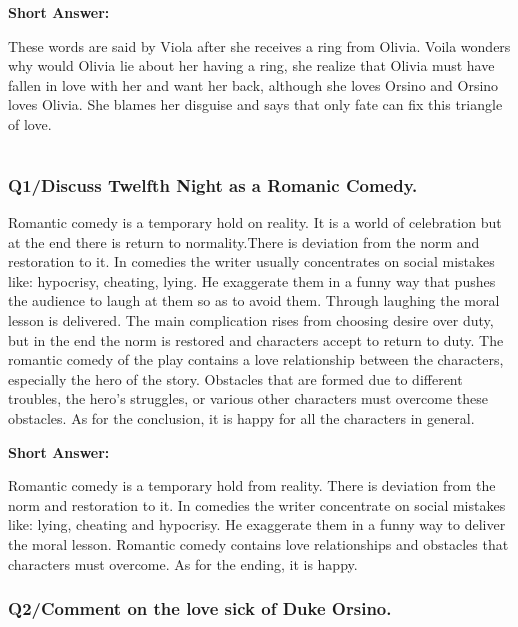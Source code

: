 \documentclass[12pt, a4paper]{article}
\begin{document}
\textbf{Short Answer:}\smallbreak

These words are said by Viola after she receives a ring from Olivia. Voila
wonders why would Olivia lie about her having a ring, she realize that 
Olivia must have fallen in love with her and want her back, although
she loves Orsino and Orsino loves Olivia. She blames  her disguise and 
says that only fate can fix this triangle of love.

\section*{}\bigbreak

\subsubsection*{Q1/Discuss Twelfth Night as a Romanic Comedy.}

Romantic comedy is a temporary hold on reality. It is a world of 
celebration but at the end there is return to normality.There is 
deviation from
the norm and restoration to it. In comedies the writer usually 
concentrates on social mistakes like: hypocrisy, cheating, lying. He
exaggerate them in a funny way that pushes the audience to laugh at them so as to avoid them. 
Through laughing the moral lesson is delivered. The main complication
rises from choosing desire over duty, but in the end the norm is
restored and characters accept to return to duty. The romantic comedy
of the play contains a love relationship between the characters, 
especially the hero of the story. Obstacles that are formed due to 
different troubles, the hero's struggles, or various other characters
must overcome these obstacles. As for the conclusion, it is happy for 
all the characters in general.\medbreak

\textbf{Short Answer:}\smallbreak

Romantic comedy is a temporary hold from reality. There is deviation from
the norm and restoration to it. In comedies the writer concentrate on
social mistakes like: lying, cheating and hypocrisy. He exaggerate them
in a funny way to deliver the moral lesson. Romantic comedy contains
love relationships and obstacles that characters must overcome. As
for the ending, it is happy.

\subsubsection*{Q2/Comment on the love sick of Duke Orsino.}
\end{document}
